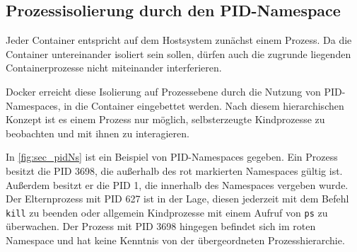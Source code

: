 \documentclass[../main.tex]{subfiles}
\begin{document}


		\subsection{Prozessisolierung durch den \acrshort{PID}-Namespace}
		\label{secIsoProcesses}

			Jeder Container entspricht auf dem Hostsystem zunächst einem Prozess. Da die Container untereinander isoliert sein sollen, dürfen auch die zugrunde liegenden Containerprozesse nicht miteinander interferieren.

			Docker erreicht diese Isolierung auf Prozessebene durch die Nutzung von PID-Namespaces, in die Container eingebettet werden. Nach diesem hierarchischen Konzept ist es einem Prozess nur möglich, selbsterzeugte Kindprozesse zu beobachten und mit ihnen zu interagieren.

			In \fig \ref{fig:sec_pidNs} ist ein Beispiel von PID-Namespaces gegeben. Ein Prozess besitzt die PID 3698, die außerhalb des rot markierten Namespaces gültig ist. Außerdem besitzt er die PID 1, die innerhalb des Namespaces vergeben wurde. Der Elternprozess mit PID 627 ist in der Lage, diesen jederzeit mit dem Befehl \texttt{kill} zu beenden oder allgemein Kindprozesse mit einem Aufruf von \texttt{ps} zu überwachen. Der Prozess mit PID 3698 hingegen befindet sich im roten Namespace und hat keine Kenntnis von der übergeordneten Prozesshierarchie.

\end{document}
